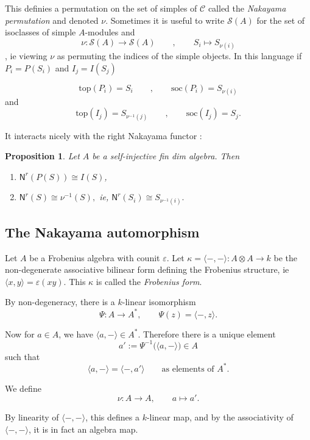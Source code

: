 \documentclass[11pt]{article}
\newcommand{\C}{\mathcal{C}}
\newtheorem{proposition}[theorem]{Proposition}
\theoremstyle{definition}
\begin{document}
This definies a permutation on the set of simples of $\C$ called the \textit{Nakayama permutation} and denoted $\nu$.  Sometimes it is useful to write $\mathcal{S}(A)$ for the set of isoclasses of simple $A$-modules and $$\nu: \mathcal{S}(A) \to \mathcal{S}(A) \qquad  , \qquad S_i \mapsto S_{\nu (i)}$$, ie viewing $\nu$ as permuting the indices of the simple objects. In this language if $P_i =P(S_i)$ and $I_j =I(S_j)$

$$ \mathrm{top}(P_i)= S_i    \qquad  , \qquad   \mathrm{soc}(P_i)= S_{\nu (i)}   $$ and 
$$ \mathrm{top}(I_j)= S_{\nu^{-1} (j)}    \qquad  , \qquad   \mathrm{soc}(I_j)= S_j  . $$ 




It interacts nicely with the right Nakayama functor :


\begin{proposition}\label{prop:Naka}
Let $A$ be a self-injective fin dim algebra. Then
\begin{enumerate}
\item $\mathsf{N}^r(P(S)) \cong I(S)$,
\item $\mathsf{N}^r(S)\cong \nu^{-1}(S),$ ie, $\mathsf{N}^r(S_i)\cong S_{\nu^{-1}(i)}.$
\end{enumerate}
\end{proposition}



\subsection{The Nakayama automorphism}


Let $A$ be a Frobenius algebra with counit $\varepsilon$. Let $\kappa = \langle -, - \rangle : A \otimes A \to k$ be the non-degenerate associative bilinear form defining the Frobenius structure, ie $\langle x,y \rangle = \varepsilon (xy) $. This $\kappa$ is called the \textit{Frobenius form}.

By non-degeneracy, there is a $k$-linear isomorphism
\[
\Psi : A \longrightarrow A^{*}, \qquad \Psi(z) = \langle -, z \rangle.
\]

Now for $a \in A$, we have $\langle a, - \rangle \in A^{*}$. Therefore there is a unique element
\[
a' := \Psi^{-1}\big( \langle a, - \rangle \big) \in A
\]
such that
\[
\langle a, - \rangle = \langle -, a' \rangle \qquad \text{as elements of } A^{*}.
\]

We define
\[
\nu : A \longrightarrow A, \qquad a \longmapsto a'.
\]

By linearity of $\langle -, - \rangle$, this defines a $k$-linear map, and by the associativity of $\langle -, - \rangle$, it is in fact an algebra map.
\end{document}
